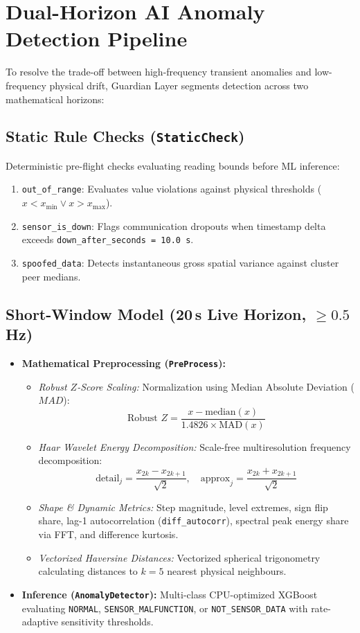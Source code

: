 \documentclass[10pt,a4paper]{report}
\begin{document}
\section{Dual-Horizon AI Anomaly Detection Pipeline}
To resolve the trade-off between high-frequency transient anomalies and low-frequency physical drift, Guardian Layer segments detection across two mathematical horizons:

\subsection{Static Rule Checks (\texttt{StaticCheck})}
Deterministic pre-flight checks evaluating reading bounds before ML inference:
\begin{enumerate}
  \item \lstinline{out_of_range}: Evaluates value violations against physical thresholds ($x < x_{\min} \lor x > x_{\max}$).
  \item \lstinline{sensor_is_down}: Flags communication dropouts when timestamp delta exceeds \lstinline{down_after_seconds = 10.0 s}.
  \item \lstinline{spoofed_data}: Detects instantaneous gross spatial variance against cluster peer medians.
\end{enumerate}

\subsection{Short-Window Model (20\,s Live Horizon, $\ge 0.5$\,Hz)}
\begin{itemize}[leftmargin=*]
  \item \textbf{Mathematical Preprocessing (\texttt{PreProcess}):}
  \begin{itemize}
    \item \textit{Robust $Z$-Score Scaling:} Normalization using Median Absolute Deviation ($MAD$):
    \begin{equation}
      \text{Robust } Z = \frac{x - \text{median}(x)}{1.4826 \times \text{MAD}(x)}
    \end{equation}
    \item \textit{Haar Wavelet Energy Decomposition:} Scale-free multiresolution frequency decomposition:
    \begin{equation}
      \text{detail}_j = \frac{x_{2k} - x_{2k+1}}{\sqrt{2}}, \quad \text{approx}_j = \frac{x_{2k} + x_{2k+1}}{\sqrt{2}}
    \end{equation}
    \item \textit{Shape \& Dynamic Metrics:} Step magnitude, level extremes, sign flip share, lag-1 autocorrelation (\texttt{diff\_autocorr}), spectral peak energy share via FFT, and difference kurtosis.
    \item \textit{Vectorized Haversine Distances:} Vectorized spherical trigonometry calculating distances to $k=5$ nearest physical neighbours.
  \end{itemize}
  \item \textbf{Inference (\texttt{AnomalyDetector}):} Multi-class CPU-optimized XGBoost evaluating \texttt{NORMAL}, \texttt{SENSOR\_MALFUNCTION}, or \texttt{NOT\_SENSOR\_DATA} with rate-adaptive sensitivity thresholds.
\end{itemize}
\end{document}
